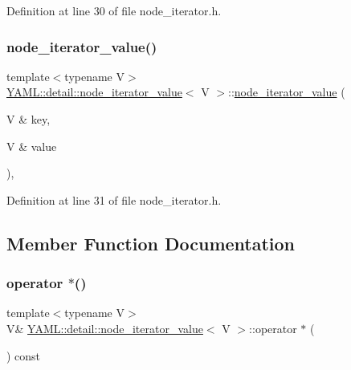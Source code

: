 Definition at line 30 of file node\+\_\+iterator.\+h.

\mbox{\label{struct_y_a_m_l_1_1detail_1_1node__iterator__value_a3d7d97c184a28526a72bf9399962a903}} 
\subsubsection{\texorpdfstring{node\_iterator\_value()}{node\_iterator\_value()}\hspace{0.1cm}{\footnotesize\ttfamily [3/3]}}
{\footnotesize\ttfamily template$<$typename V$>$ \\
\mbox{\hyperlink{struct_y_a_m_l_1_1detail_1_1node__iterator__value}{Y\+A\+M\+L\+::detail\+::node\+\_\+iterator\+\_\+value}}$<$ V $>$\+::\mbox{\hyperlink{struct_y_a_m_l_1_1detail_1_1node__iterator__value}{node\+\_\+iterator\+\_\+value}} (\begin{DoxyParamCaption}\item[{V \&}]{key,  }\item[{V \&}]{value }\end{DoxyParamCaption})\hspace{0.3cm}{\ttfamily [inline]}, {\ttfamily [explicit]}}



Definition at line 31 of file node\+\_\+iterator.\+h.



\subsection{Member Function Documentation}
\mbox{\label{struct_y_a_m_l_1_1detail_1_1node__iterator__value_a35cfd0fcd0a60abae1e8f259fe7413c7}} 
\subsubsection{\texorpdfstring{operator $\ast$()}{operator *()}}
{\footnotesize\ttfamily template$<$typename V$>$ \\
V\& \mbox{\hyperlink{struct_y_a_m_l_1_1detail_1_1node__iterator__value}{Y\+A\+M\+L\+::detail\+::node\+\_\+iterator\+\_\+value}}$<$ V $>$\+::operator $\ast$ (\begin{DoxyParamCaption}{ }\end{DoxyParamCaption}) const\hspace{0.3cm}{\ttfamily [inline]}}



